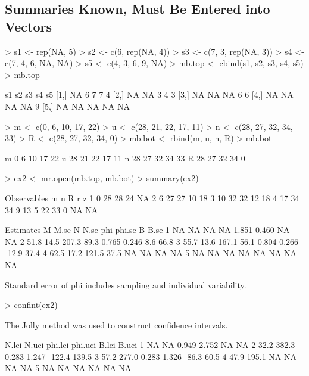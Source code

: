 \documentclass[a4paper]{article}
\begin{document}
\subsection{Summaries Known, Must Be Entered into Vectors}
\begin{Schunk}
\begin{Sinput}
> s1 <- rep(NA, 5)
> s2 <- c(6, rep(NA, 4))
> s3 <- c(7, 3, rep(NA, 3))
> s4 <- c(7, 4, 6, NA, NA)
> s5 <- c(4, 3, 6, 9, NA)
> mb.top <- cbind(s1, s2, s3, s4, s5)
> mb.top
\end{Sinput}
\begin{Soutput}
     s1 s2 s3 s4 s5
[1,] NA  6  7  7  4
[2,] NA NA  3  4  3
[3,] NA NA NA  6  6
[4,] NA NA NA NA  9
[5,] NA NA NA NA NA
\end{Soutput}
\begin{Sinput}
> m <- c(0, 6, 10, 17, 22)
> u <- c(28, 21, 22, 17, 11)
> n <- c(28, 27, 32, 34, 33)
> R <- c(28, 27, 32, 34, 0)
> mb.bot <- rbind(m, u, n, R)
> mb.bot
\end{Sinput}
\begin{Soutput}
  [,1] [,2] [,3] [,4] [,5]
m    0    6   10   17   22
u   28   21   22   17   11
n   28   27   32   34   33
R   28   27   32   34    0
\end{Soutput}
\begin{Sinput}
> ex2 <- mr.open(mb.top, mb.bot)
> summary(ex2)
\end{Sinput}
\begin{Soutput}
Observables
   m  n  R  r  z
1  0 28 28 24 NA
2  6 27 27 10 18
3 10 32 32 12 18
4 17 34 34  9 13
5 22 33  0 NA NA

Estimates
     M M.se     N N.se   phi phi.se     B B.se
1   NA   NA    NA   NA 1.851  0.460    NA   NA
2 51.8 14.5 207.3 89.3 0.765  0.246   8.6 66.8
3 55.7 13.6 167.1 56.1 0.804  0.266 -12.9 37.4
4 62.5 17.2 121.5 37.5    NA     NA    NA   NA
5   NA   NA    NA   NA    NA     NA    NA   NA

Standard error of phi includes sampling and individual variability.
\end{Soutput}
\begin{Sinput}
> confint(ex2)
\end{Sinput}
\begin{Soutput}
The Jolly method was used to construct confidence intervals.

  N.lci N.uci phi.lci phi.uci  B.lci B.uci
1    NA    NA   0.949   2.752     NA    NA
2  32.2 382.3   0.283   1.247 -122.4 139.5
3  57.2 277.0   0.283   1.326  -86.3  60.5
4  47.9 195.1      NA      NA     NA    NA
5    NA    NA      NA      NA     NA    NA
\end{Soutput}
\end{Schunk}
\end{document}
